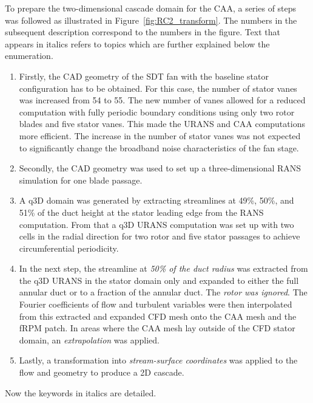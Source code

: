 To prepare the two-dimensional cascade domain for the CAA, a series of steps was followed as illustrated in Figure~\ref{fig:RC2_transform}. The numbers in the subsequent description correspond to the numbers in the figure. Text that appears in italics refers to topics which are further explained below the enumeration.
\begin{enumerate}
\item Firstly, the CAD geometry of the SDT fan with the baseline stator configuration has to be obtained.  For this case, the number of stator vanes was increased from 54 to 55.  The new number of vanes allowed for a reduced computation with fully periodic boundary conditions using only two rotor blades and five stator vanes.  This made the URANS and CAA computations more efficient.  The increase in the number of stator vanes was not expected to significantly change the broadband noise characteristics of the fan stage.       

\item Secondly, the CAD geometry was used to set up a three-dimensional RANS simulation for one blade passage. 

\item A q3D domain was generated by extracting streamlines at 49\%, 50\%, and 51\% of the duct height at the stator leading edge from the RANS computation.  From that a q3D URANS computation was set up with two cells in the radial direction for two rotor and five stator passages to achieve circumferential periodicity. 

\item In the next step, the streamline at \textit{50\% of the duct radius} was extracted from the q3D URANS in the stator domain only and expanded to either the full annular duct or to a fraction of the annular duct. The \textit{rotor was ignored}. The Fourier coefficients of flow and turbulent variables were then interpolated from this extracted and expanded CFD mesh onto the CAA mesh and the fRPM patch.  In areas where the CAA mesh lay outside of the  CFD stator domain, an \textit{extrapolation} was applied.  

\item Lastly, a transformation into \textit{stream-surface coordinates} was applied to the flow and geometry to produce a 2D cascade.               
\end{enumerate}
Now the keywords in italics are detailed.

